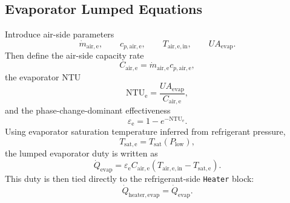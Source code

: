 \documentclass[11pt]{article}
\begin{document}
\subsection{Evaporator Lumped Equations}
Introduce air-side parameters
\begin{equation}
\dot{m}_{\mathrm{air,e}}, \qquad
c_{p,\mathrm{air,e}}, \qquad
T_{\mathrm{air,e,in}}, \qquad
UA_{\mathrm{evap}}.
\end{equation}
Then define the air-side capacity rate
\begin{equation}
C_{\mathrm{air,e}} = \dot{m}_{\mathrm{air,e}} c_{p,\mathrm{air,e}},
\end{equation}
the evaporator NTU
\begin{equation}
\mathrm{NTU}_{\mathrm{e}} = \frac{UA_{\mathrm{evap}}}{C_{\mathrm{air,e}}},
\end{equation}
and the phase-change-dominant effectiveness
\begin{equation}
\varepsilon_{\mathrm{e}} = 1 - e^{-\mathrm{NTU}_{\mathrm{e}}}.
\end{equation}
Using evaporator saturation temperature inferred from refrigerant pressure,
\begin{equation}
T_{\mathrm{sat,e}} = T_{\mathrm{sat}}(P_{\mathrm{low}}),
\end{equation}
the lumped evaporator duty is written as
\begin{equation}
\dot{Q}_{\mathrm{evap}} =
\varepsilon_{\mathrm{e}} C_{\mathrm{air,e}}
\left(T_{\mathrm{air,e,in}} - T_{\mathrm{sat,e}}\right).
\end{equation}
This duty is then tied directly to the refrigerant-side \texttt{Heater} block:
\begin{equation}
\dot{Q}_{\mathrm{heater,evap}} = \dot{Q}_{\mathrm{evap}}.
\end{equation}
\end{document}
